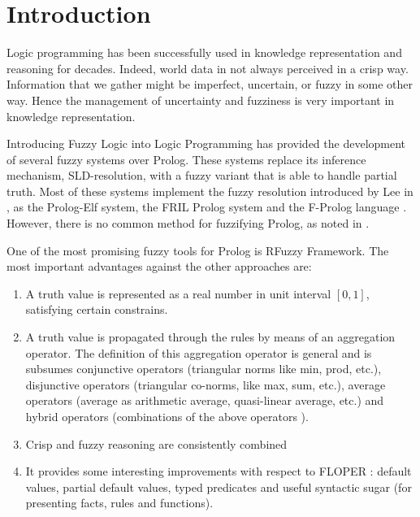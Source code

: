 \section{Introduction}
Logic programming \cite{Llo87} has been successfully used in knowledge representation and reasoning for decades. Indeed, world data in not always perceived in a crisp way. Information that we gather might be imperfect, uncertain, or fuzzy in some other way. Hence the management of uncertainty and fuzziness is very important in knowledge representation.

Introducing Fuzzy Logic into Logic Programming has provided the development of several fuzzy systems over Prolog. These systems replace its inference mechanism, SLD-resolution, with a fuzzy variant that is able to handle partial truth. Most of these systems implement the fuzzy resolution introduced by Lee in \cite{Lee72}, as the Prolog-Elf system, the FRIL Prolog system \cite{IK85} and the F-Prolog language \cite{LL90}. However, there is no common method for fuzzifying Prolog, as noted in \cite{SDM89}.

One of the most promising fuzzy tools for Prolog is RFuzzy Framework. The most important advantages against the other approaches are:
\begin{enumerate}
\item A truth value is represented as a real number in unit interval $[0,1]$, satisfying certain constrains. 
\item A truth value is propagated through the rules by means of an aggregation operator. The definition of this aggregation operator is general and is subsumes conjunctive operators (triangular norms \cite{KPMRPE00} like min, prod, etc.), disjunctive operators \cite{TCC95} (triangular co-norms, like max, sum, etc.),
average operators (average as arithmetic average, quasi-linear average, etc.) and hybrid operators (combinations of the above operators \cite{PTC02}). 
\item Crisp and fuzzy reasoning are consistently combined
\item It provides some interesting improvements with respect to FLOPER \cite{MM08a,Mor06}: default values, partial default values, typed predicates and useful syntactic sugar (for presenting facts, rules and functions).
\end{enumerate}